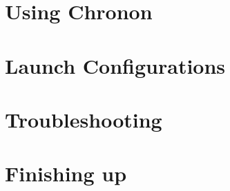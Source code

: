 \section{Using Chronon}
\label{TasksChronon}
 

\section{Launch Configurations}
\label{LaunchConfigurations}


\clearpage

\section{Troubleshooting}


\clearpage

\section{Finishing up}

